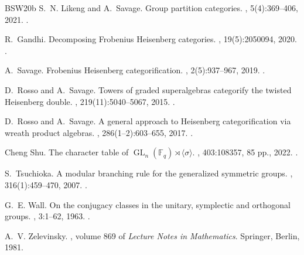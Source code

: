 \documentclass[12pt]{amsart}
\numberwithin{itemcounter}{subsection}
\theoremstyle{plain}
\theoremstyle{definition}
\theoremstyle{remark}
\numberwithin{equation}{section}
\begin{document}
\begin{thebibliography}{BSW20b}
S.~N. Likeng and A.~Savage.
\newblock Group partition categories.
, 5(4):369--406, 2021.
\newblock \href{https://doi.org/10.4171/JCA/55}
  {}.

R.~Gandhi.
\newblock Decomposing Frobenius {H}eisenberg categories.
, 19(5):2050094, 2020.
\newblock \href{https://doi.org/10.1142/S0219498820500942}
  {}.

A.~Savage.
\newblock Frobenius {H}eisenberg categorification.
, 2(5):937--967, 2019.
\newblock \href{https://doi.org/10.5802/alco.73}
  {}.

D.~Rosso and A.~Savage.
\newblock Towers of graded superalgebras categorify the twisted {H}eisenberg double.
, 219(11):5040--5067, 2015.
\newblock \href{https://doi.org/10.1016/j.jpaa.2015.03.016}
  {}.

D.~Rosso and A.~Savage.
\newblock A general approach to {H}eisenberg categorification via wreath product algebras.
, 286(1--2):603--655, 2017.
\newblock \href{https://doi.org/10.1007/s00209-016-1776-9}
  {}.

Cheng Shu.
\newblock The character table of $\operatorname{GL}_n(\mathbb{F}_q) \rtimes
  \langle \sigma \rangle$.
, 403:108357, 85 pp., 2022.
\newblock \href {https://doi.org/10.1016/j.aim.2022.108357}
  {}.

S.~Tsuchioka.
\newblock A modular branching rule for the generalized symmetric groups.
, 316(1):459--470, 2007.
\newblock \href{https://doi.org/10.1016/j.jalgebra.2006.12.007}
  {}.

G.~E. Wall.
\newblock On the conjugacy classes in the unitary, symplectic and orthogonal groups.
, 3:1--62, 1963.
\newblock \href{https://doi.org/10.1017/S1446788700027622}
  {}.

A.~V. Zelevinsky.
, volume 869 of {\em Lecture Notes in Mathematics}.
\newblock Springer, Berlin, 1981.

\end{thebibliography}
\end{document}
